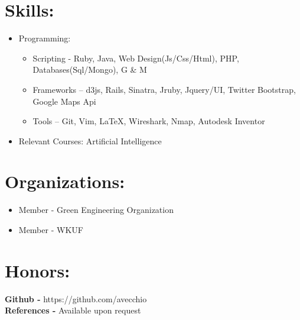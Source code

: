 \documentclass{res}
\begin{document}
\section{Skills:}
\begin{itemize}
\item Programming:
\begin{itemize}[label=$\circ$]
\item Scripting - Ruby, Java, Web Design(Js/Css/Html), PHP, Databases(Sql/Mongo), G \& M
\item Frameworks – d3js, Rails, Sinatra, Jruby, Jquery/UI, Twitter Bootstrap, Google Maps Api
\item Tools – Git, Vim, \LaTeX, Wireshark, Nmap, Autodesk Inventor
\end{itemize}
\item Relevant Courses: Artificial Intelligence
\end{itemize}
\section{Organizations:}
\begin{itemize}
\item Member - Green Engineering Organization
\item Member - WKUF
\end{itemize}

\section{Honors:}
\begin{itemize}
\end{itemize}

\begin{center}
\textbf{Github - }https://github.com/avecchio\\
\textbf{References - }Available upon request
\end{center}
\end{document}
